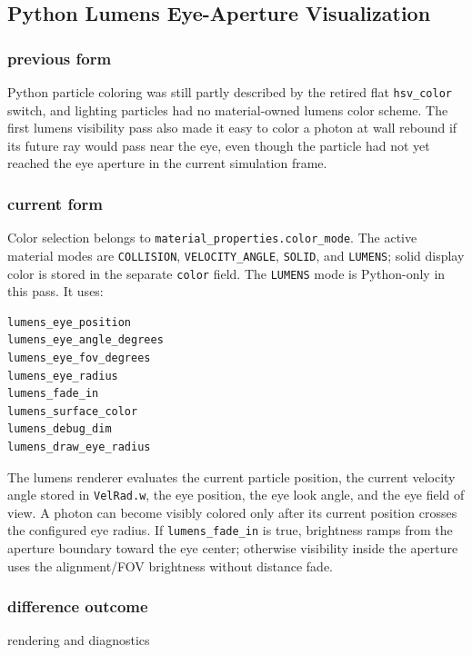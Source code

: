 \subsection{Python Lumens Eye-Aperture Visualization}

\subsubsection{previous form}

Python particle coloring was still partly described by the retired flat
\texttt{hsv\_color} switch, and lighting particles had no material-owned
lumens color scheme.  The first lumens visibility pass also made it easy to
color a photon at wall rebound if its future ray would pass near the eye,
even though the particle had not yet reached the eye aperture in the current
simulation frame.

\subsubsection{current form}

Color selection belongs to \texttt{material\_properties.color\_mode}.  The
active material modes are \texttt{COLLISION}, \texttt{VELOCITY\_ANGLE},
\texttt{SOLID}, and \texttt{LUMENS}; solid display color is stored in the
separate \texttt{color} field.  The \texttt{LUMENS} mode is Python-only in
this pass.
It uses:
\begin{verbatim}
lumens_eye_position
lumens_eye_angle_degrees
lumens_eye_fov_degrees
lumens_eye_radius
lumens_fade_in
lumens_surface_color
lumens_debug_dim
lumens_draw_eye_radius
\end{verbatim}

The lumens renderer evaluates the current particle position, the current
velocity angle stored in \texttt{VelRad.w}, the eye position, the eye look
angle, and the eye field of view.  A photon can become visibly colored only
after its current position crosses the configured eye radius.  If
\texttt{lumens\_fade\_in} is true, brightness ramps from the aperture boundary
toward the eye center; otherwise visibility inside the aperture uses the
alignment/FOV brightness without distance fade.

\subsubsection{difference outcome}

rendering and diagnostics

